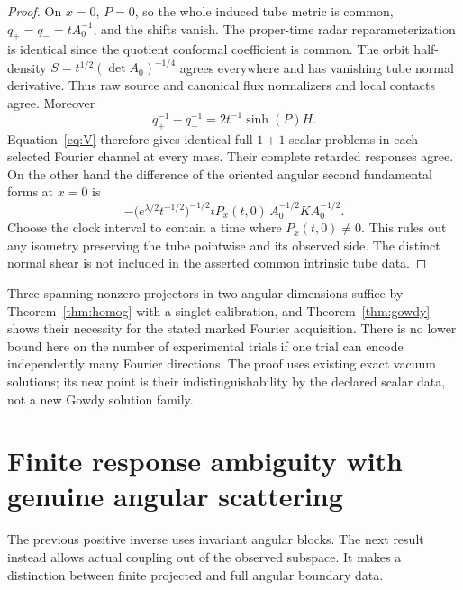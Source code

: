 \documentclass[11pt]{article}
\begin{document}
\begin{proof}
On \(x=0\), \(P=0\), so the whole induced tube metric is common, \(q_+=q_-=t A_0^{-1}\), and the shifts vanish. The proper-time radar reparameterization is identical since the quotient conformal coefficient is common. The orbit half-density \(S=t^{1/2}(\det A_0)^{-1/4}\) agrees everywhere and has vanishing tube normal derivative. Thus raw source and canonical flux normalizers and local contacts agree. Moreover
\[
 q_+^{-1}-q_-^{-1}=2t^{-1}\sinh(P)H .
\]
Equation~\eqref{eq:V} therefore gives identical full \(1+1\) scalar problems in each selected Fourier channel at every mass. Their complete retarded responses agree. On the other hand the difference of the oriented angular second fundamental forms at \(x=0\) is
\[
 -\big(e^{\lambda/2}t^{-1/2}\big)^{-1/2}
  t P_x(t,0)\, A_0^{-1/2} K A_0^{-1/2}.
\]
Choose the clock interval to contain a time where \(P_x(t,0)\ne0\). This rules out any isometry preserving the tube pointwise and its observed side. The distinct normal shear is not included in the asserted common intrinsic tube data.
\end{proof}

Three spanning nonzero projectors in two angular dimensions suffice by Theorem~\ref{thm:homog} with a singlet calibration, and Theorem~\ref{thm:gowdy} shows their necessity for the stated marked Fourier acquisition. There is no lower bound here on the number of experimental trials if one trial can encode independently many Fourier directions. The proof uses existing exact vacuum solutions; its new point is their indistinguishability by the declared scalar data, not a new Gowdy solution family.

\section{Finite response ambiguity with genuine angular scattering}\label{sec:inhom}

The previous positive inverse uses invariant angular blocks. The next result instead allows actual coupling out of the observed subspace. It makes a distinction between finite projected and full angular boundary data.
\end{document}
